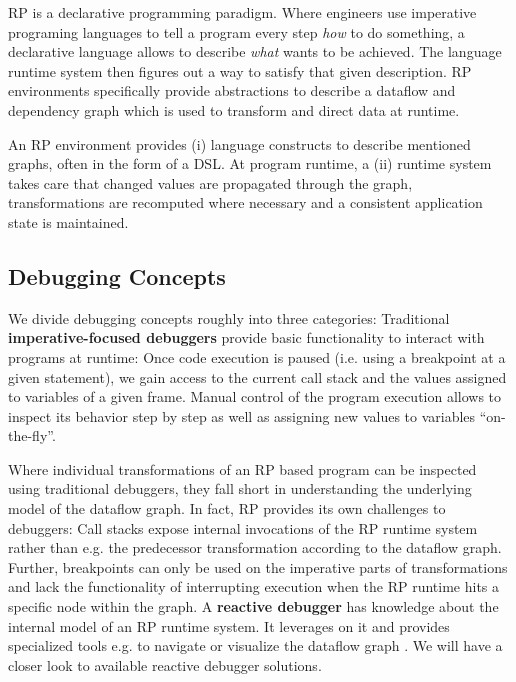 \documentclass[12pt,a4paper]{article}
\begin{document}
RP is a declarative programming paradigm. Where engineers use imperative programing languages to tell a program every step \emph{how} to do something, a declarative language allows to describe \emph{what} wants to be achieved. The language runtime system then figures out a way to satisfy that given description. RP environments specifically provide abstractions to describe a dataflow and dependency graph which is used to transform and direct data at runtime.

An RP environment provides (i) language constructs to describe mentioned graphs, often in the form of a DSL\cite{10.1145/2577080.2577083}. At program runtime, a (ii) runtime system takes care that changed values are propagated through the graph, transformations are recomputed where necessary and a consistent application state is maintained.

\subsection{Debugging Concepts}

We divide debugging concepts roughly into three categories: Traditional \textbf{imperative-focused debuggers} provide basic functionality to interact with programs at runtime: Once code execution is paused (i.e. using a breakpoint at a given statement), we gain access to the current call stack and the values assigned to variables of a given frame. Manual control of the program execution allows to inspect its behavior step by step as well as assigning new values to variables ``on-the-fly''.

Where individual transformations of an RP based program can be inspected using traditional debuggers, they fall short in understanding the underlying model of the dataflow graph. In fact, RP provides its own challenges to debuggers: Call stacks expose internal invocations of the RP runtime system rather than e.g. the predecessor transformation according to the dataflow graph. Further, breakpoints can only be used on the imperative parts of transformations and lack the functionality of interrupting execution when the RP runtime hits a specific node within the graph. A \textbf{reactive debugger} has knowledge about the internal model of an RP runtime system. It leverages on it and provides specialized tools e.g. to navigate or visualize the dataflow graph \cite{10.1145/2884781.2884815} \cite{10.1145/3180155.3180156} \cite{rxviz}. We will have a closer look to available reactive debugger solutions.
\end{document}
